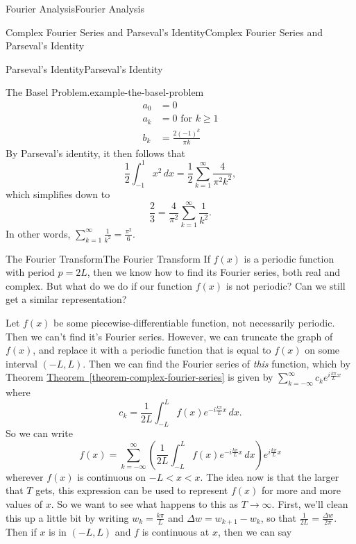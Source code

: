 \documentclass[10pt,]{book}
\numberwithin{equation}{section}
\begin{document}
\begin{chapterptx}{Fourier Analysis}{}{Fourier Analysis}{}{}
\begin{sectionptx}{Complex Fourier Series and Parseval's Identity}{}{Complex Fourier Series and Parseval's Identity}{}{}
\begin{subsectionptx}{Parseval's Identity}{}{Parseval's Identity}{}{}
\begin{example}{The Basel Problem.}{example-the-basel-problem}
\begin{align*}
a_{0} & = 0 \\
a_{k} & = 0 \text{ for } k\geq 1 \\
b_{k} & = \frac{2(-1)^{k}}{\pi k} 
\end{align*}
By Parseval's identity, it then follows that%
\begin{equation*}
\frac{1}{2}\int_{-1}^{1}x^{2}\,dx = \frac{1}{2}\sum_{k=1}^{\infty}\frac{4}{\pi^{2}k^{2}},
\end{equation*}
which simplifies down to%
\begin{equation*}
\frac{2}{3} = \frac{4}{\pi^{2}}\sum_{k=1}^{\infty}\frac{1}{k^{2}}.
\end{equation*}
In other words, \(\sum_{k=1}^{\infty}\frac{1}{k^{2}} = \frac{\pi^{2}}{6}.\)%
\end{example}
\end{subsectionptx}
\end{sectionptx}
%
%
\typeout{************************************************}
\typeout{************************************************}
%
\begin{sectionptx}{The Fourier Transform}{}{The Fourier Transform}{}{}\label{subsection-the-fourier-transform}
\hypertarget{p-420}{}%
If \(f(x)\) is a periodic function with period \(p=2L\), then we know how to find its Fourier series, both real and complex. But what do we do if our function \(f(x)\) is not periodic? Can we still get a similar representation?%
\par
\hypertarget{p-421}{}%
Let \(f(x)\) be some piecewise-differentiable function, not necessarily periodic. Then we can't find it's Fourier series. However, we can truncate the graph of \(f(x)\), and replace it with a periodic function that is equal to \(f(x)\) on some interval \((-L,L)\). Then we can find the Fourier series of \emph{this} function, which by Theorem \hyperref[theorem-complex-fourier-series]{Theorem~\ref{theorem-complex-fourier-series}} is given by \(\sum_{k=-\infty}^{\infty}c_{k}e^{i\frac{k\pi}{L}x}\) where%
\begin{equation*}
c_{k} = \frac{1}{2L}\int_{-L}^{L}f(x)e^{-i\frac{k\pi}{L}x}\,dx.
\end{equation*}
So we can write%
\begin{equation*}
f(x) = \sum_{k=-\infty}^{\infty}\left(\frac{1}{2L}\int_{-L}^{L}f(x)e^{-i\frac{k\pi}{L}x}\,dx\right)e^{i\frac{k\pi}{L}x}
\end{equation*}
wherever \(f(x)\) is continuous on \(-L<x<x\). The idea now is that the larger that \(T\) gets, this expression can be used to represent \(f(x)\) for more and more values of \(x\). So we want to see what happens to this as \(T\to\infty\). First, we'll clean this up a little bit by writing \(w_{k} = \frac{k\pi}{L}\) and \(\Delta w = w_{k+1} - w_{k}\), so that \(\frac{1}{2L} = \frac{\Delta w}{2\pi}\). Then if \(x\) is in \((-L,L)\) and \(f\) is continuous at \(x\), then we can say%

\end{sectionptx}
\end{chapterptx}
\end{document}
